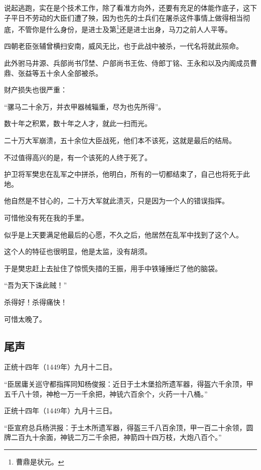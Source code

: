 \begin{multicols}{\theparacolNo}
说起逃跑，实在是个技术工作，除了看准方向外，还要有充足的体能作底子，这下子平日不劳动的大臣们遭了殃，因为也先的士兵们在屠杀这件事情上做得相当彻底，不管你是什么身份，是进士及第\footnote{曹鼎是状元。}还是进士出身，马刀之前人人平等。

四朝老臣张辅曾横扫安南，威风无比，也于此战中被杀，一代名将就此殒命。

此外驸马井源、兵部尚书邝埜、户部尚书王佐、侍郎丁铭、王永和以及内阁成员曹鼎、张益等五十余人全部被杀。

财产损失也很严重：

“骡马二十余万，并衣甲器械辎重，尽为也先所得”。

数十年之积累，数十年之人才，就此一扫而光。

二十万大军崩溃，五十余位大臣战死，他们本不该死，这就是最后的结局。

不过值得高兴的是，有一个该死的人终于死了。

护卫将军樊忠在乱军之中拼杀，他明白，所有的一切都结束了，自己也将死于此地。

他自然是不甘心的，二十万大军就此溃灭，只是因为一个人的错误指挥。

可惜他没有死在我的手里。

似乎是上天要满足他最后的心愿，不久之后，他居然在乱军中找到了这个人。

这个人的特征也很明显，他是太监，没有胡须。

于是樊忠赶上去扯住了惊慌失措的王振，用手中铁锤捶烂了他的脑袋。

“吾为天下诛此贼！”

杀得好！杀得痛快！

可惜太晚了。

\subsection{尾声}
正统十四年（1449年）九月十二日。

“臣居庸关巡守都指挥同知杨俊报：近日于土木堡拾所遗军器，得盔六千余顶，甲五千八十领，神枪一万一千余把，神铳六百余个，火药一十八桶。”

正统十四年（1449年）九月十三日。

“臣宣府总兵杨洪报：于土木所遗军器，得盔三千八百余顶，甲一百二十余领，圆牌二百九十余面，神铳二万二千余把，神箭四十四万枝，大炮八百个。”
\ifnum{}
	\end{multicols}
\fi
\newpage
